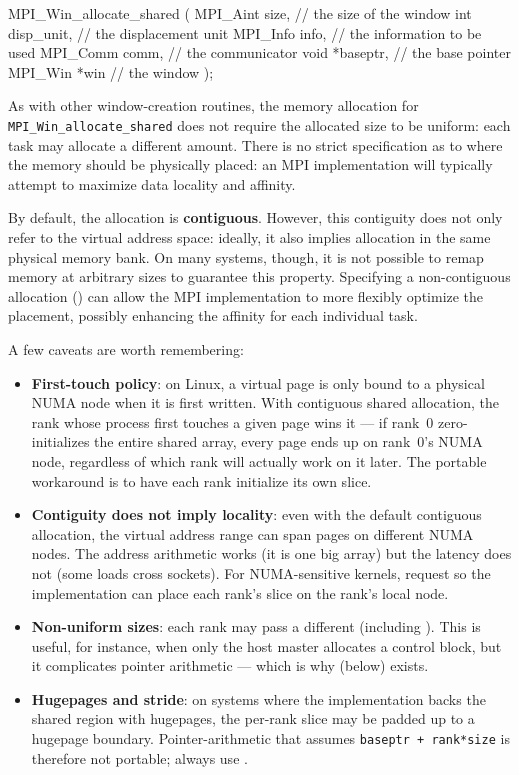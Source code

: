 \begin{codeblock}[language=C]
MPI_Win_allocate_shared ( 
    MPI_Aint size,        // the size of the window
    int disp_unit,        // the displacement unit
    MPI_Info info,        // the information to be used
    MPI_Comm comm,        // the communicator
    void *baseptr,        // the base pointer
    MPI_Win *win          // the window
);
\end{codeblock}

As with other window-creation routines, the memory allocation for \texttt{MPI\_Win\_allocate\_shared} does not require the allocated size to be uniform: each task may allocate a different amount. There is no strict specification as to where the memory should be physically placed: an MPI implementation will typically attempt to maximize data locality and affinity.

By default, the allocation is \textbf{contiguous}. However, this contiguity does not only refer to the virtual address space: ideally, it also implies allocation in the same physical memory bank. On many systems, though, it is not possible to remap memory at arbitrary sizes to guarantee this property. Specifying a non-contiguous allocation () can allow the MPI implementation to more flexibly optimize the placement, possibly enhancing the affinity for each individual task.

A few caveats are worth remembering:

\begin{itemize}
    \item \textbf{First-touch policy}: on Linux, a virtual page is only bound to a physical NUMA node when it is first written. With contiguous shared allocation, the rank whose process first touches a given page wins it --- if rank~0 zero-initializes the entire shared array, every page ends up on rank~0's NUMA node, regardless of which rank will actually work on it later. The portable workaround is to have each rank initialize its own slice.
    \item \textbf{Contiguity does not imply locality}: even with the default contiguous allocation, the virtual address range can span pages on different NUMA nodes. The address arithmetic works (it is one big array) but the latency does not (some loads cross sockets). For NUMA-sensitive kernels, request  so the implementation can place each rank's slice on the rank's local node.
    \item \textbf{Non-uniform sizes}: each rank may pass a different  (including ). This is useful, for instance, when only the host master allocates a control block, but it complicates pointer arithmetic --- which is why  (below) exists.
    \item \textbf{Hugepages and stride}: on systems where the implementation backs the shared region with hugepages, the per-rank slice may be padded up to a hugepage boundary. Pointer-arithmetic that assumes \texttt{baseptr + rank*size} is therefore not portable; always use .
\end{itemize}


